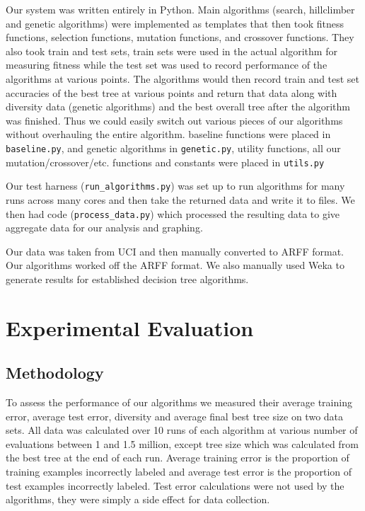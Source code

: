 \documentclass{acm_proc_article-sp}
\begin{document}
Our system was written entirely in Python. Main algorithms (search, hillclimber and genetic algorithms) were implemented as templates that then took fitness functions, selection functions, mutation functions, and crossover functions. They also took train and test sets, train sets were used in the actual algorithm for measuring fitness while the test set was used to record performance of the algorithms at various points. The algorithms would then record train and test set accuracies of the best tree at various points and return that data along with diversity data (genetic algorithms) and the best overall tree after the algorithm was finished. Thus we could easily switch out various pieces of our algorithms without overhauling the entire algorithm. baseline functions were placed in \texttt{baseline.py}, and genetic algorithms in \texttt{genetic.py}, utility functions, all our mutation/crossover/etc. functions and constants were placed in \texttt{utils.py}

Our test harness (\texttt{run\_algorithms.py}) was set up to run algorithms for many runs across many cores and then take the returned data and write it to files. We then had code (\texttt{process\_data.py}) which processed the resulting data to give aggregate data for our analysis and graphing.

Our data was taken from UCI \cite{Bache+Lichman:2013} and then manually converted to ARFF format. Our algorithms worked off the ARFF format. We also manually used Weka \cite{Hall:2009} to generate results for established decision tree algorithms.

\section{Experimental Evaluation}

\subsection{Methodology}

To assess the performance of our algorithms we measured their average training error, average test error, diversity and average final best tree size on two data sets. All data was calculated over 10 runs of each algorithm at various number of evaluations between 1 and 1.5 million, except tree size which was calculated from the best tree at the end of each run. Average training error is the proportion of training examples incorrectly labeled and average test error is the proportion of test examples incorrectly labeled. Test error calculations were not used by the algorithms, they were simply a side effect for data collection.
\end{document}
